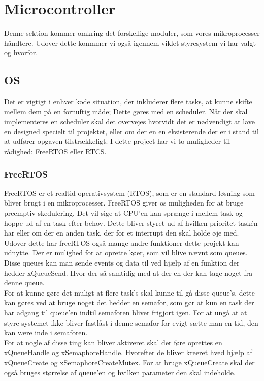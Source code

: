 \section{Microcontroller}

Denne sektion kommer omkring det forskellige moduler, som vores mikroprocesser håndtere. Udover dette konmmer vi også igennem viklet styresystem vi har valgt og hvorfor.

\subsection{OS}
Det er vigtigt i enhver kode situation, der inkluderer flere tasks, at kunne skifte mellem dem på en fornuftig måde; Dette gøres med en scheduler. Når der skal implementeres en scheduler skal det overvejes hvorvidt det er nødvendigt at lave en designed specielt til projektet, eller om der en en eksisterende der er i stand til at udfører opgaven tilstrækkeligt. I dette project har vi to muligheder til rådighed: FreeRTOS eller RTCS.



\subsubsection{FreeRTOS}

FreeRTOS \cite{FreeRTOSorg} er et realtid operativsystem (RTOS), som er en standard løsning som bliver brugt i en mikroprocesser. FreeRTOS giver os muligheden for at bruge preemptiv skedulering, Det vil sige at CPU'en kan sprænge i mellem task og hoppe ud af en task efter behov. Dette bliver styret ud af hvilken prioritet taskén har eller om der en anden task, der for et interrupt den skal holde øje med.
\\
Udover dette har freeRTOS også mange andre funktioner dette projekt kan udnytte. Der er mulighed for at oprette køer, som vil blive nævnt som queues. Disse queues kan man sende events og data til ved hjælp af en funktion der hedder xQueueSend. Hvor der så samtidig med at der en der kan tage noget fra denne queue. 
\\
For at kunne gøre det muligt at flere task's skal kunne til gå disse queue's, dette kan gøres ved at bruge noget det hedder en semafor, som gør at kun en task der har adgang til queue'en indtil semaforen bliver frigjort igen. For at ungå at at styre systemet ikke bliver fastlåst i denne semafor for evigt sætte man en tid, den kan være inde i semaforen.
\\
For at nogle af disse ting kan bliver aktiveret skal der føre oprettes en xQueueHandle og xSemaphoreHandle. Hvorefter de bliver kreeret hved hjælp af xQueueCreate og xSemaphoreCreateMutex. For at bruge xQueueCreate skal der også bruges størrelse af queue'en og hvilken parameter den skal indeholde.  

